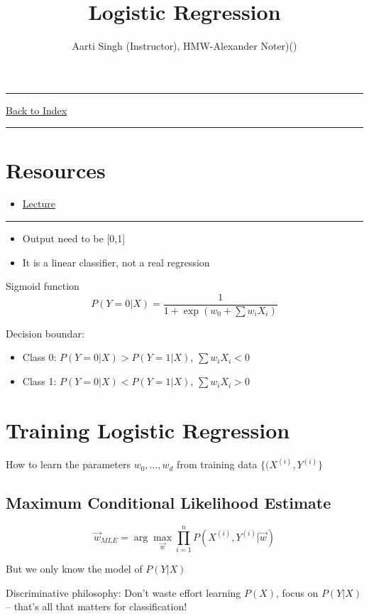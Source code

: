 \documentclass[letterpaper,10pt]{article}
\title{\textbf{Logistic Regression}}
\author{Aarti Singh (Instructor), HMW-Alexander Noter)()}
\newcommand{\panhline}{\begin{center}\rule{\textwidth}{1pt}\end{center}}
\begin{document}
\maketitle

\panhline
\href{../index.html}{Back to Index}

\panhline
\tableofcontents

\section*{Resources}

\begin{itemize}
	\item \href{../../Lectures/05_LinearLogisticRegression.pdf}{Lecture}
\end{itemize}

\panhline

\begin{itemize}
	\item Output need to be [0,1]
	\item It is a linear classifier, not a real regression
\end{itemize}
	
Sigmoid function
$$P(Y=0|X)=\frac{1}{1+\exp(w_0+\sum{w_iX_i})}$$

Decision boundar:
\begin{itemize}
	\item Class 0: $P(Y=0|X)>P(Y=1|X)$, $\sum{w_iX_i}<0$
	\item Class 1: $P(Y=0|X)<P(Y=1|X)$, $\sum{w_iX_i}>0$
\end{itemize}

\section{Training Logistic Regression}

How to learn the parameters $w_0,\dots,w_d$ from training data $\{(X^{(i)},Y^{(i)}\}$

\subsection{Maximum Conditional Likelihood Estimate}
$$\hat{\vec{w}}_{MLE} = \arg\max_{\vec{w}} \prod_{i=1}^{n}P(X^{(i)},Y^{(i)}|\vec{w})$$

But we only know the model of $P(Y|X)$

Discriminative philosophy: Don't waste effort learning $P(X)$, focus on $P(Y|X)$ -- that's all that matters for classification!
\end{document}
